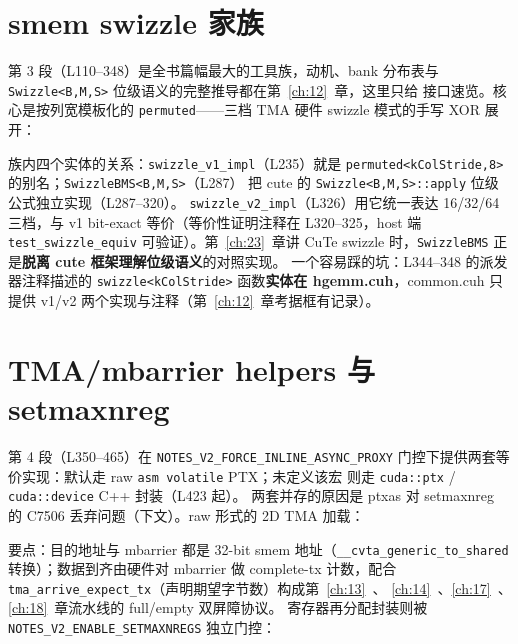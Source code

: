 \section{smem swizzle 家族}

第 3 段（L110--348）是全书篇幅最大的工具族，动机、bank 分布表与
\texttt{Swizzle\allowbreak{}<B,\allowbreak{}M,\allowbreak{}S>} 位级语义的完整推导都在第~\ref{ch:12}~章，这里只给
接口速览。核心是按列宽模板化的 \texttt{permuted}——三档 TMA 硬件 swizzle
模式的手写 XOR 展开：



族内四个实体的关系：\texttt{swizzle\_\allowbreak{}v1\_\allowbreak{}impl}（L235）就是
\texttt{permuted\allowbreak{}<k\allowbreak{}Col\allowbreak{}Stride,\allowbreak{}8>} 的别名；\texttt{Swizzle\allowbreak{}BMS\allowbreak{}<B,\allowbreak{}M,\allowbreak{}S>}（L287）
把 cute 的 \texttt{Swizzle\allowbreak{}<B,\allowbreak{}M,\allowbreak{}S>::\allowbreak{}apply} 位级公式独立实现（L287--320）。
\texttt{swizzle\_\allowbreak{}v2\_\allowbreak{}impl}（L326）用它统一表达 16/32/64 三档，与 v1
bit-exact 等价（等价性证明注释在 L320--325，host 端
\texttt{test\_\allowbreak{}swizzle\_\allowbreak{}equiv} 可验证）。第~\ref{ch:23}~章讲 CuTe swizzle
时，\texttt{SwizzleBMS} 正是\textbf{脱离 cute 框架理解位级语义}的对照实现。
一个容易踩的坑：L344--348 的派发器注释描述的
\texttt{swizzle\allowbreak{}<k\allowbreak{}Col\allowbreak{}Stride>} 函数\textbf{实体在 hgemm.cuh}，common.cuh 只
提供 v1/v2 两个实现与注释（第~\ref{ch:12}~章考据框有记录）。

\section{TMA/mbarrier helpers 与 setmaxnreg}

第 4 段（L350--465）在 \texttt{NOTES\_\allowbreak{}V2\_\allowbreak{}FORCE\_\allowbreak{}INLINE\_\allowbreak{}ASYNC\_\allowbreak{}PROXY}
门控下提供两套等价实现：默认走 raw \texttt{asm volatile} PTX；未定义该宏
则走 \texttt{cuda::ptx} / \texttt{cuda::\allowbreak{}device} C++ 封装（L423 起）。
两套并存的原因是 ptxas 对 setmaxnreg 的 C7506 丢弃问题（下文）。raw 形式的
2D TMA 加载：



要点：目的地址与 mbarrier 都是 32-bit smem 地址（\texttt{\_\allowbreak{}\_\allowbreak{}cvta\_\allowbreak{}generic\_\allowbreak{}to\_\allowbreak{}shared}
转换）；数据到齐由硬件对 mbarrier 做 complete-tx 计数，配合
\texttt{tma\_\allowbreak{}arrive\_\allowbreak{}expect\_\allowbreak{}tx}（声明期望字节数）构成第~\ref{ch:13}~、
\ref{ch:14}~、\ref{ch:17}~、\ref{ch:18}~章流水线的 full/empty 双屏障协议。
寄存器再分配封装则被 \texttt{NOTES\_\allowbreak{}V2\_\allowbreak{}ENABLE\_\allowbreak{}SETMAXNREGS} 独立门控：

